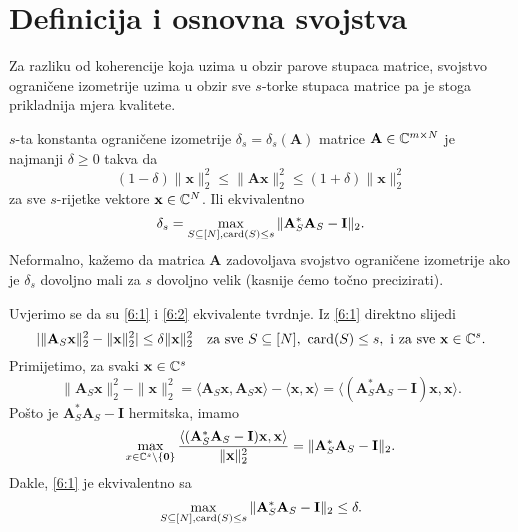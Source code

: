 \documentclass[a4paper,twoside,12pt]{memoir} %
\newcommand{\vect}[1]{\mathbf{#1}}
\renewcommand{\vec}{\vect}
\newcommand{\card}{\text{\normalfont{card}}}
\newcommand{\norm}[1]{\|{#1}\|}
\begin{document}
\section[Definicija i osnovna svojstva][Definicija i osnovna svojstva]{Definicija i osnovna svojstva}
Za razliku od koherencije koja uzima u obzir parove stupaca matrice, svojstvo ograni\v{c}ene izometrije uzima u obzir sve $s$-torke stupaca matrice pa je stoga prikladnija mjera kvalitete.
\begin{defn}\label{defn:6:1}
    $s$-ta konstanta ograni\v{c}ene izometrije $\delta_s = \delta_s(\vec A)$ matrice $\vec A \in \C^{m \times N}$ je najmanji $\delta \geq 0$ takva da
    \begin{equation}\label{6:1}
        (1-\delta) \norm{\vec x}_2^2 \leq \norm{\vec{Ax}}_2^2 \leq (1+\delta)\norm{\vec x}_2^2 
    \end{equation}
    za sve $s$-rijetke vektore $\vec x \in \C^N$. Ili ekvivalentno
    \begin{equation}\label{6:2}
        \delta_s = \max_{S \subseteq [N], \card(S) \leq s} \norm{\vec A^*_S \vec A_S - \vec I}_2.
    \end{equation}
    Neformalno, ka\v{z}emo da matrica $\vec A$ zadovoljava svojstvo ograni\v{c}ene izometrije ako je $\delta_s$ dovoljno mali za $s$ dovoljno velik (kasnije \'cemo to\v{c}no precizirati).
\end{defn}
Uvjerimo se da su \eqref{6:1} i \eqref{6:2} ekvivalente tvrdnje. Iz \eqref{6:1} direktno slijedi
\begin{equation*}
    | \norm{\vec A_S \vec x}_2^2 - \norm{\vec x}_2^2| \leq \delta \norm{\vec x}_2^2 \quad \text{za sve } S \subseteq [N],\ \card(S) \leq s,\ \text{i za sve } \vec x \in \C^s.
\end{equation*}
Primijetimo, za svaki $\vec x \in \C^s$
\begin{equation*}
    \norm{\vec A_S \vec x}_2^2 - \norm{\vec x}_2^2 = \langle \vec A_S \vec x, \vec A_S \vec x \rangle - \langle \vec x, \vec x \rangle = \langle (\vec A_S^* \vec A_S - \vec I )\vec x, \vec x\rangle.
\end{equation*}
Po\v{s}to je $\vec A_S^* \vec A_S - \vec I$ hermitska, imamo
\begin{equation*}
    \max_{x \in \C^s \backslash \{\vec 0\}} \frac{\langle (\vec A_S^* \vec A_S - \vec I)\vec x, \vec x \rangle}{\norm{\vec x}_2^2} = \norm{\vec A_S^* \vec A_S - \vec I}_2.
\end{equation*}
Dakle, \eqref{6:1} je ekvivalentno sa
\begin{equation*}
    \max_{S \subseteq [N], \card(S) \leq s} \norm{\vec A^*_S \vec A_S - \vec I}_2 \leq \delta. 
\end{equation*}
\end{document}

